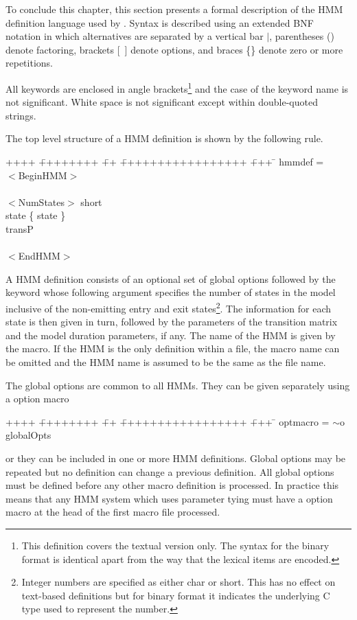 To conclude this chapter,
this section presents a formal description
of the HMM definition language used by \HTK.
Syntax is described using an extended BNF notation in which
alternatives are separated by a vertical bar $|$, parentheses () denote
factoring, brackets [\ ] denote options, and braces \{\} denote zero or more
repetitions. 

All keywords are enclosed in angle brackets\footnote{
This definition covers the textual version only.  The syntax for
the binary format
is identical apart from the way that the lexical items are encoded.} and
the case of the
keyword name is not significant.
White space is not significant except within double-quoted strings.

The top level structure of a HMM definition is shown by the following
rule. 
{\sf
\begin{tabbing}
++++ \= ++++++++ \= ++ \= +++++++++++++++++ \= +++ \=  \kill
\>  hmmdef =  \\
\>\>         $<$BeginHMM$>$ \\
\>\>\>          [ globalOpts ] \\
\>\>\>          $<$NumStates$>$ short \\
\>\>\>          state \{ state \} \\
\>\>\>          transP \\
\>\>\>          [ duration ] \\
\>\>         $<$EndHMM$>$ 
\end{tabbing}
}
A HMM definition consists of an optional set of global options followed by
the  keyword whose following argument specifies the number of states in 
the model inclusive of the non-emitting entry and exit states\footnote{
Integer numbers are specified as either \textsf{char} or \textsf{short}.
This has no effect on text-based definitions but for binary format it indicates
the underlying C type used to represent the number.}.
The information for each state is then given in turn, followed by the 
parameters of the transition matrix and the model duration parameters, if any.
The name of the HMM is given by the  macro.  If the HMM is the
only definition within a file, the  macro name can be omitted
and the HMM name is assumed to be the same as the file name.

The global options are common to all HMMs.  They can be given 
separately using a  option macro 
{\sf
\begin{tabbing}
++++ \= ++++++++ \= ++ \= +++++++++++++++++ \= +++ \=  \kill
\> optmacro = \> $\sim$o globalOpts 
\end{tabbing}
}
\noindent
or they can be included in one or more HMM definitions.  Global
options may be repeated but no definition can change a previous
definition.  All global options must be defined before any other
macro definition is processed.  In practice this means that any
HMM system which uses parameter tying must have a  option macro 
at the head of the first macro file processed.

